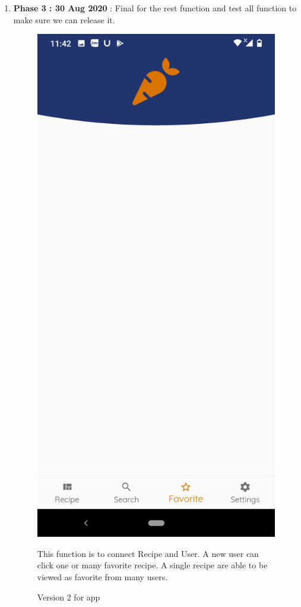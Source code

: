 \documentclass{article}
\begin{document}
\begin{enumerate}
        \item \textbf{Phase 3 : 30 Aug 2020} : Final for the rest function and test all function to make sure we can release it. \\
        \begin{figure}[h!]
        \centering
        \includegraphics[scale=0.1]{Images/Favorite.jpg}
        \caption{Version 2 for app}
        \label{fig:cookingbook}
        This function is to connect Recipe and User. A new user can click one or many favorite recipe. A single recipe are able to be viewed as favorite from many users.
        \end{figure}


\end{enumerate}
\end{document}
